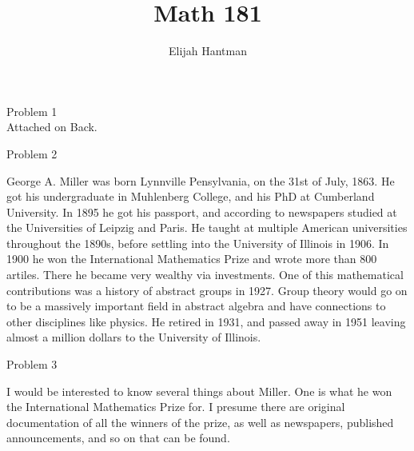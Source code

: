 \documentclass{report}
\title{\Huge{Math 181}}
\author{\huge{Elijah Hantman}}
\date{}
\begin{document}
\maketitle
\newpage

\begin{description}
    \item {\large Problem 1}\\ 
        Attached on Back.
    \item {\large Problem 2}
        \begin{mdframed}
            George A. Miller was born Lynnville
            Pensylvania, on the 31st of July, 1863.
            He got his undergraduate in Muhlenberg College,
            and his PhD at Cumberland University. 
            In 1895 he got his passport, and according to
            newspapers studied at the Universities of Leipzig
            and Paris. He taught at multiple American universities throughout
            the 1890s, before settling into the University of Illinois in
            1906. In 1900 he won the International Mathematics Prize
            and wrote more than 800 artiles.
            There he became very wealthy via investments.
            One of this mathematical contributions was a history of
            abstract groups in 1927. Group theory would go on to
            be a massively important field in abstract algebra
            and have connections to other disciplines like physics.
            He retired in 1931, and passed away in 1951 leaving
            almost a million dollars to the University of Illinois.
        \end{mdframed}
        \begin{center}
        \end{center}
    \item {\large Problem 3}
        \begin{mdframed}
            I would be interested to know several things about
            Miller. One is what he won the International Mathematics
            Prize for. I presume there are original documentation
            of all the winners of the prize, as well as newspapers,
            published announcements, and so on that can be found.


\end{mdframed}
\end{description}
\end{document}
